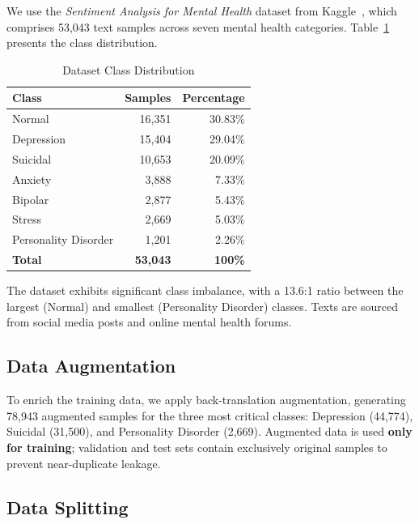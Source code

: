 \documentclass[conference, 10pt]{IEEEtran}
\begin{document}
We use the \textit{Sentiment Analysis for Mental Health} dataset from Kaggle~\cite{sarkar2023dataset}, which comprises 53,043 text samples across seven mental health categories. Table~\ref{tab:dataset} presents the class distribution.

\begin{table}[t]
    \centering
    \caption{Dataset Class Distribution}
    \label{tab:dataset}
    \begin{tabular}{lrr}
        \toprule
        \textbf{Class} & \textbf{Samples} & \textbf{Percentage} \\
        \midrule
        Normal               & 16,351 & 30.83\% \\
        Depression           & 15,404 & 29.04\% \\
        Suicidal             & 10,653 & 20.09\% \\
        Anxiety              &  3,888 &  7.33\% \\
        Bipolar              &  2,877 &  5.43\% \\
        Stress               &  2,669 &  5.03\% \\
        Personality Disorder &  1,201 &  2.26\% \\
        \midrule
        \textbf{Total}       & \textbf{53,043} & \textbf{100\%} \\
        \bottomrule
    \end{tabular}
\end{table}

The dataset exhibits significant class imbalance, with a 13.6:1 ratio between the largest (Normal) and smallest (Personality Disorder) classes. Texts are sourced from social media posts and online mental health forums.

\subsection{Data Augmentation}

To enrich the training data, we apply back-translation augmentation, generating 78,943 augmented samples for the three most critical classes: Depression (44,774), Suicidal (31,500), and Personality Disorder (2,669). Augmented data is used \textbf{only for training}; validation and test sets contain exclusively original samples to prevent near-duplicate leakage.

\subsection{Data Splitting}
\end{document}
